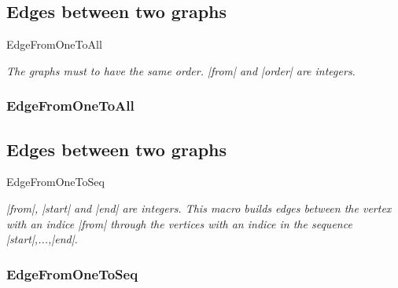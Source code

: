 \newpage
\subsection{Edges between two graphs }
\begin{NewMacroBox}{EdgeFromOneToAll}{}

\medskip
\emph{The graphs must to have the same order. |from| and |order| are integers.}
\end{NewMacroBox}

\subsubsection{EdgeFromOneToAll}
\begin{center}
\begin{tkzexample}
\end{tkzexample}
\end{center}

\newpage
\subsection{Edges between two graphs }
\begin{NewMacroBox}{EdgeFromOneToSeq}{}

\medskip
\emph{|from|, |start| and |end| are integers. This macro  builds edges between the vertex with an indice |from| through the vertices with an indice in the sequence |start|,...,|end|.}
\end{NewMacroBox} 

\subsubsection{EdgeFromOneToSeq}
\begin{center}
\begin{tkzexample}
\end{tkzexample}
\end{center}

